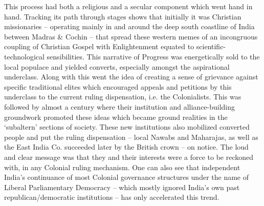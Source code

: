 This process had both a religious and a secular component which went hand in hand. Tracking its path through stages shows that initially it was Christian missionaries – operating mainly in and around the deep south coastline of India between Madras \& Cochin – that spread these western memes of an incongruous coupling of Christian Gospel with Enlightenment equated to scientific-technological sensibilities. This narrative of Progress was energetically sold to the local populace and yielded converts, especially amongst the aspirational underclass. Along with this went the idea of creating a sense of grievance against specific traditional elites which encouraged appeals and petitions by this underclass to the current ruling dispensation, i.e. the Colonialists. This was followed by almost a century where their institution and alliance-building groundwork promoted these ideas which became ground realities in the ‘subaltern’ sections of society. These new institutions also mobilized converted people and put the ruling dispensation – local Nawabs and Maharajas, as well as the East India Co. succeeded later by the British crown – on notice. The loud and clear message was that they and their interests were a force to be reckoned with, in any Colonial ruling mechanism. One can also see that independent India’s continuance of most Colonial governance structures under the name of Liberal Parliamentary Democracy – which mostly ignored India’s own past republican/democratic institutions – has only accelerated this trend.

